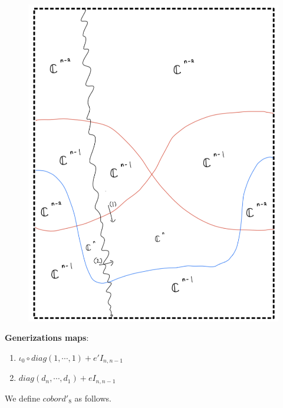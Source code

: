 \begin{figure}[H]
    \centering
    \includegraphics[scale = 0.85]{diagrams/cobord'8/10.png}
    \caption{}
    \label{fig:your-label}
\end{figure}
\textbf{Generizations maps}:
\begin{enumerate}[label = (\arabic*)]
\item $\iota_0 \circ diag(1,\cdots,1) + e'I_{n,n-1}$
\item $diag(d_{n},\cdots,d_1) + eI_{n,n-1}$
\end{enumerate}
\pagebreak
We define $cobord'_8$ as follows.
